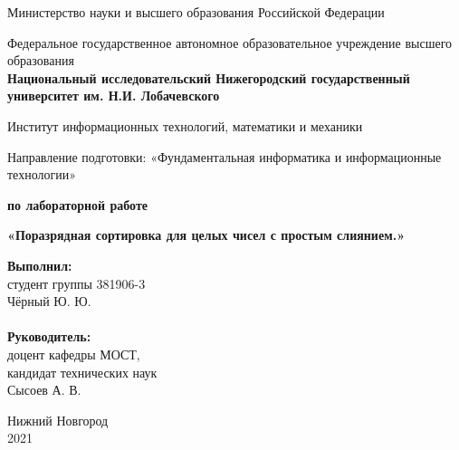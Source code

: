 \documentclass{report}
\begin{document}
\begin{titlepage}

\begin{center}
Министерство науки и высшего образования Российской Федерации
\end{center}

\begin{center}
Федеральное государственное автономное образовательное учреждение высшего образования \\
\textbf{Национальный исследовательский Нижегородский государственный университет им. Н.И. Лобачевского}
\end{center}

\begin{center}
Институт информационных технологий, математики и механики
\end{center}

\begin{center}
Направление подготовки: «Фундаментальная информатика и информационные технологии»
\end{center}

\vspace{4em}

\begin{center}
\textbf{ по лабораторной работе} \\
\end{center}
\begin{center}
\textbf{\Large«Поразрядная сортировка для целых чисел с простым слиянием.»} \\
\end{center}

\vspace{4em}

\newbox{\lbox}
\newlength{\maxl}
\setlength{\maxl}{\wd\lbox}
\hfill\parbox{7cm}{
\hspace*{5cm}\hspace*{-5cm}\textbf{Выполнил:} \\ студент группы 381906-3 \\ Чёрный Ю. Ю.\\
\\
\hspace*{5cm}\hspace*{-5cm}\textbf{Руководитель:}\\ доцент кафедры МОСТ, \\ кандидат технических наук \\ Сысоев А. В.\\
}
\vspace{\fill}

\begin{center} Нижний Новгород \\ 2021 \end{center}

\end{titlepage}
\end{document}

